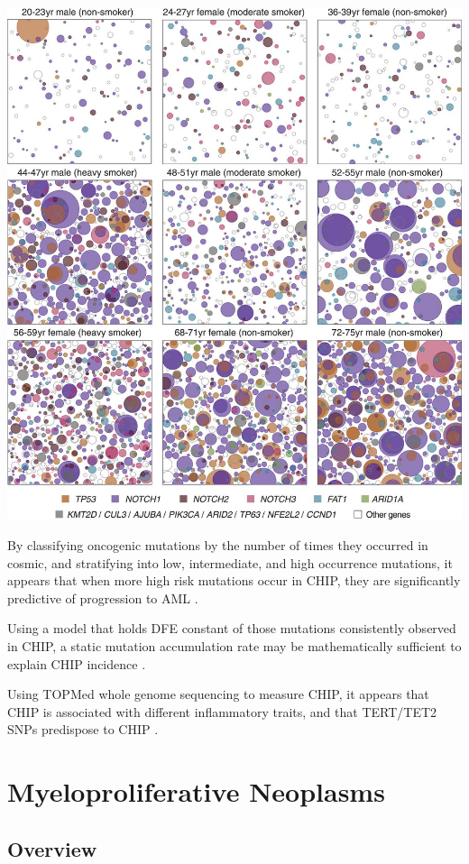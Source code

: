 \documentclass[]{book}
\begin{document}
\includegraphics{images/04-5.jpg}

By classifying oncogenic mutations by the number of times they occurred in cosmic, and stratifying into low, intermediate, and high occurrence mutations, it appears that when more high risk mutations occur in CHIP, they are significantly predictive of progression to AML \citep{abelson2018prediction}.

Using a model that holds DFE constant of those mutations consistently observed in CHIP, a static mutation accumulation rate may be mathematically sufficient to explain CHIP incidence \citep{Watson2019-lg}.

Using TOPMed whole genome sequencing to measure CHIP, it appears that CHIP is associated with different inflammatory traits, and that TERT/TET2 SNPs predispose to CHIP \citep{Bick2019-ji}.

\hypertarget{myeloproliferative-neoplasms}{%
\section{Myeloproliferative Neoplasms}\label{myeloproliferative-neoplasms}}

\hypertarget{overview}{%
\subsection{Overview}\label{overview}}
\end{document}
